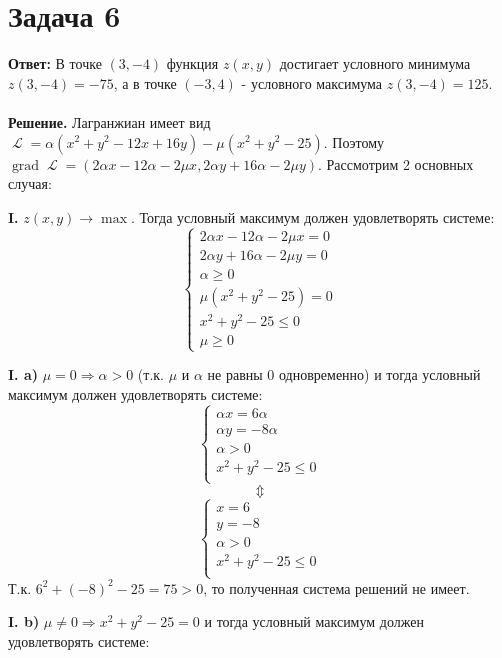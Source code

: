 \documentclass{article}
\DeclareMathOperator{\grad}{grad}
\DeclareMathOperator{\lagr}{\mathcal{L}}
\begin{document}
\section*{Задача 6}
 {\bf Ответ: } В точке $(3,-4)$ функция $z(x,y)$ достигает условного минимума $z(3,-4)=-75$, а в точке $(-3,4)$  - условного максимума $z(3,-4)=125$.
 \\
 \\
 {\bf Решение.} Лагранжиан имеет вид $\lagr = \alpha(x^2+y^2-12x+16y)-\mu(x^2+y^2-25)$. Поэтому $\grad \lagr=(2\alpha x - 12\alpha - 2\mu x, 2\alpha y + 16\alpha - 2\mu y)$. Рассмотрим 2 основных случая: 
 \par
{\bf I.} $z(x,y) \to \max$. Тогда условный максимум должен удовлетворять системе:
\begin{equation*}
 \begin{cases}
   2\alpha x - 12\alpha-2\mu x = 0\\
   2\alpha y + 16\alpha-2\mu y = 0\\
   \alpha \geq 0\\
   \mu(x^2+y^2-25) = 0\\
   x^2+y^2-25 \leq 0\\
   \mu \geq 0
 \end{cases}
\end{equation*}
\par 
{\bf I. a)} $\mu=0\Rightarrow \alpha > 0$ (т.к. $\mu$ и $\alpha$ не равны 0 одновременно) и тогда условный максимум должен удовлетворять системе:
\begin{equation*}
 \begin{cases}
   \alpha x = 6\alpha\\
   \alpha y =-8\alpha\\
   \alpha > 0\\
   x^2+y^2-25 \leq 0\\
 \end{cases}
\end{equation*}
$$\Updownarrow$$
\begin{equation*}
 \begin{cases}
   x = 6\\
   y = -8\\
   \alpha > 0\\
   x^2+y^2-25 \leq 0\\
 \end{cases}
\end{equation*}
Т.к. $6^2+(-8)^2-25=75 > 0$, то полученная система решений не имеет.
\par
{\bf I. b)} $\mu \neq 0\Rightarrow x^2+y^2-25=0$ и тогда условный максимум должен удовлетворять системе:
\end{document}
